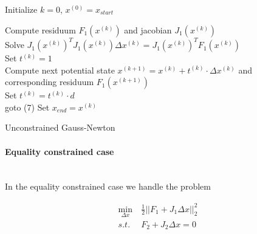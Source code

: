 \documentclass{scrartcl}[12pt, halfparskip]
\numberwithin{equation}{section}
\numberwithin{figure}{section}
\numberwithin{table}{section}
\begin{document}
\begin{algorithm}[H]
	
	
	
	Initialize $k=0$, $x^{(0)} = x_{start}$
	
	{
		Compute residuum $F_1(x^{(k)})$ and jacobian $J_1(x^{(k)})$ \\
		Solve $J_1(x^{(k)})^T J_1(x^{(k)}) \Delta x^{(k)} = J_1(x^{(k)})^T F_1(x^{(k)})$ \\
		Set $t^{(k)} = 1$ \\
		Compute next potential state $x^{(k+1)} = x^{(k)} + t^{(k)} \cdot \Delta x^{(k)}$ and \\ \quad corresponding residuum $F_1(x^{(k+1)})$ \\
		
		{Set $t^{(k)} = t^{(k)} \cdot d$ \\
			goto (7)}
	}
	Set $x_{end} = x^{(k)}$
	\caption{Unconstrained Gauss-Newton}
	\label{alg:Gauss_Newton_unconstrained}
\end{algorithm}


\paragraph{Equality constrained case}\mbox{}\\
In the equality constrained case we handle the problem

\begin{align}
	\min_{\Delta x} & \ \frac{1}{2} || F_1 + J_1 \Delta x ||_2^2 \label{eq:numerical_soln_eq_constrained_LSQ} \\
	s.t. & \ F_2 + J_2 \Delta x = 0 \nonumber
\end{align}
\end{document}
